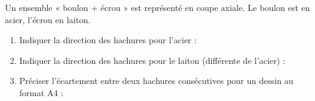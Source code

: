 \documentclass[11pt]{article}
\begin{document}
\begin{exercice}
Un ensemble « boulon + écrou » est représenté en coupe axiale. Le boulon est en acier, l'écrou en laiton.
\begin{enumerate}
    \item Indiquer la direction des hachures pour l'acier : \underline{\hspace{5cm}}
    \item Indiquer la direction des hachures pour le laiton (différente de l'acier) : \underline{\hspace{5cm}}
    \item Préciser l'écartement entre deux hachures consécutives pour un dessin au format A4 : \underline{\hspace{5cm}}
\end{enumerate}
\end{exercice}
\end{document}
